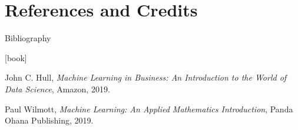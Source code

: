 \documentclass[11pt]{beamer}
\begin{document}
%
\section{References and Credits}
\begin{frame}{Bibliography}
\begin{thebibliography}{9}

[book]

 John C. Hull, \textit{Machine Learning in Business: An Introduction to the World of Data Science}, Amazon, 2019.

 Paul Wilmott, \textit{Machine Learning: An Applied Mathematics Introduction}, Panda Ohana Publishing, 2019.

\end{thebibliography}
\end{frame}
\end{document}
